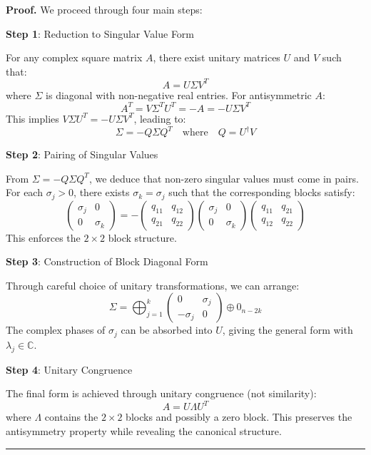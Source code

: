 \documentclass[aps,preprint]{revtex4}
\newenvironment{proof}[1][Proof]{\noindent\textbf{#1.} }{\ \rule{0.5em}{0.5em}}
\begin{document}
\begin{proof}
We proceed through four main steps:

\textbf{Step 1}: Reduction to Singular Value Form

For any complex square matrix $A$, there exist unitary matrices $U$ and $V$
such that: 
\begin{equation}
A = U \Sigma V^T
\end{equation}
where $\Sigma$ is diagonal with non-negative real entries. For antisymmetric 
$A$: 
\begin{equation}
A^T = V \Sigma^T U^T = -A = -U \Sigma V^T
\end{equation}
This implies $V \Sigma U^T = -U \Sigma V^T$, leading to: 
\begin{equation}
\Sigma = -Q \Sigma Q^T \quad \text{where} \quad Q = U^\dagger V
\end{equation}

\textbf{Step 2}: Pairing of Singular Values

From $\Sigma = -Q \Sigma Q^T$, we deduce that non-zero singular values must
come in pairs. For each $\sigma_j > 0$, there exists $\sigma_k = \sigma_j$
such that the corresponding blocks satisfy: 
\begin{equation}
\begin{pmatrix}
\sigma_j & 0 \\ 
0 & \sigma_k%
\end{pmatrix}
= -%
\begin{pmatrix}
q_{11} & q_{12} \\ 
q_{21} & q_{22}%
\end{pmatrix}
\begin{pmatrix}
\sigma_j & 0 \\ 
0 & \sigma_k%
\end{pmatrix}
\begin{pmatrix}
q_{11} & q_{21} \\ 
q_{12} & q_{22}%
\end{pmatrix}%
\end{equation}
This enforces the $2 \times 2$ block structure.

\textbf{Step 3}: Construction of Block Diagonal Form

Through careful choice of unitary transformations, we can arrange: 
\begin{equation}
\Sigma = \bigoplus_{j=1}^k 
\begin{pmatrix}
0 & \sigma_j \\ 
-\sigma_j & 0%
\end{pmatrix}
\oplus 0_{n-2k}
\end{equation}
The complex phases of $\sigma_j$ can be absorbed into $U$, giving the
general form with $\lambda_j \in \mathbb{C}$.

\textbf{Step 4}: Unitary Congruence

The final form is achieved through unitary congruence (not similarity): 
\begin{equation}
A = U \Lambda U^T
\end{equation}
where $\Lambda$ contains the $2 \times 2$ blocks and possibly a zero block.
This preserves the antisymmetry property while revealing the canonical
structure.
\end{proof}
\end{document}
